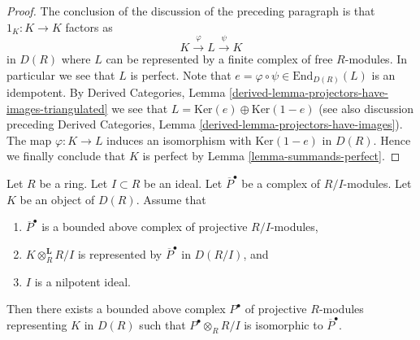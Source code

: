 \begin{proof}
\medskip\noindent
The conclusion of the discussion of the preceding paragraph is that
$1_K : K \to K$ factors as
$$
K \xrightarrow{\varphi} L \xrightarrow{\psi} K
$$
in $D(R)$ where $L$ can be represented by a finite
complex of free $R$-modules. In particular we see that $L$ is
perfect. Note that $e = \varphi \circ \psi \in \text{End}_{D(R)}(L)$
is an idempotent. By Derived Categories,
Lemma \ref{derived-lemma-projectors-have-images-triangulated}
we see that $L = \text{Ker}(e) \oplus \text{Ker}(1 - e)$
(see also discussion preceding
Derived Categories, Lemma \ref{derived-lemma-projectors-have-images}).
The map $\varphi : K \to L$ induces an isomorphism with
$\text{Ker}(1 - e)$ in $D(R)$. Hence we finally conclude that
$K$ is perfect by Lemma \ref{lemma-summands-perfect}.
\end{proof}

\begin{lemma}
\label{lemma-lift-complex-projectives}
Let $R$ be a ring. Let $I \subset R$ be an ideal. Let $\overline{P}^\bullet$
be a complex of $R/I$-modules. Let $K$ be an object of $D(R)$. Assume that
\begin{enumerate}
\item $\overline{P}^\bullet$ is a bounded above complex of
projective $R/I$-modules,
\item $K \otimes_R^\mathbf{L} R/I$ is represented by
$\overline{P}^\bullet$ in $D(R/I)$, and
\item $I$ is a nilpotent ideal.
\end{enumerate}
Then there exists a bounded above complex $P^\bullet$ of projective
$R$-modules representing $K$ in $D(R)$ such that $P^\bullet \otimes_R R/I$
is isomorphic to $\overline{P}^\bullet$.
\end{lemma}

